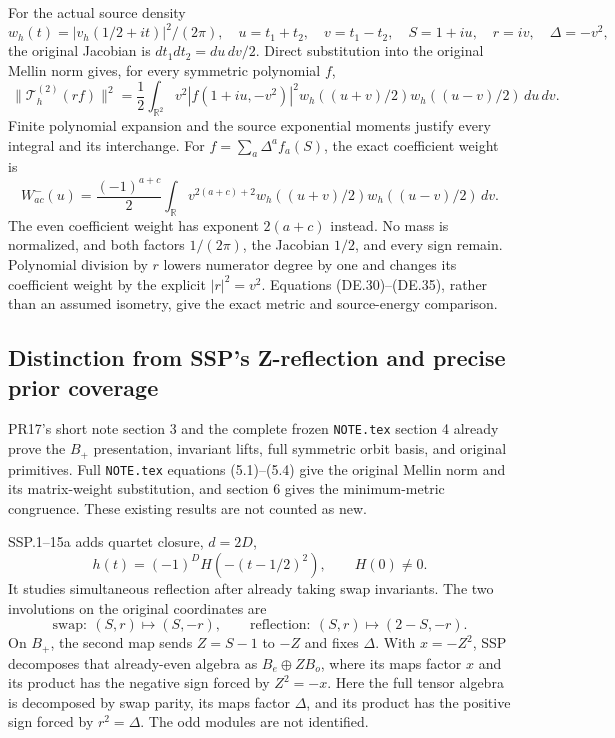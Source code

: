 For the actual source density
\[
 w_h(t)=|v_h(1/2+it)|^2/(2\pi),\quad
 u=t_1+t_2,\quad v=t_1-t_2,\quad
 S=1+iu,\quad r=iv,\quad\Delta=-v^2,
\]
the original Jacobian is \(dt_1dt_2=du\,dv/2\). Direct substitution into the original Mellin norm gives, for every symmetric polynomial \(f\),
\[
 \boxed{\ \|\mathcal T_h^{(2)}(rf)\|^2
 =\frac12\int_{\mathbb R^2}v^2|f(1+iu,-v^2)|^2
 w_h((u+v)/2)w_h((u-v)/2)\,du\,dv.\ }
 \tag{DE.34}
\]
Finite polynomial expansion and the source exponential moments justify every integral and its interchange. For \(f=\sum_a\Delta^af_a(S)\), the exact coefficient weight is
\[
 W^-_{ac}(u)=\frac{(-1)^{a+c}}2
 \int_{\mathbb R}v^{2(a+c)+2}
 w_h((u+v)/2)w_h((u-v)/2)\,dv.
 \tag{DE.35}
\]
The even coefficient weight has exponent \(2(a+c)\) instead. No mass is normalized, and both factors \(1/(2\pi)\), the Jacobian \(1/2\), and every sign remain. Polynomial division by \(r\) lowers numerator degree by one and changes its coefficient weight by the explicit \(|r|^2=v^2\). Equations (DE.30)--(DE.35), rather than an assumed isometry, give the exact metric and source-energy comparison.

\subsection{Distinction from SSP's Z-reflection and precise prior coverage}

PR17's short note section 3 and the complete frozen \texttt{NOTE.tex} section 4 already prove the \(B_+\) presentation, invariant lifts, full symmetric orbit basis, and original primitives. Full \texttt{NOTE.tex} equations (5.1)--(5.4) give the original Mellin norm and its matrix-weight substitution, and section 6 gives the minimum-metric congruence. These existing results are not counted as new.

SSP.1--15a adds quartet closure, \(d=2D\),
\[
 h(t)=(-1)^D H(-(t-1/2)^2),\qquad H(0)\ne0.
\]
It studies simultaneous reflection after already taking swap invariants. The two involutions on the original coordinates are
\[
 \mathrm{swap}:\ (S,r)\mapsto(S,-r),\qquad
 \mathrm{reflection}:\ (S,r)\mapsto(2-S,-r).
 \tag{DE.36}
\]
On \(B_+\), the second map sends \(Z=S-1\) to \(-Z\) and fixes \(\Delta\). With \(x=-Z^2\), SSP decomposes that already-even algebra as \(B_e\oplus ZB_o\), where its maps factor \(x\) and its product has the negative sign forced by \(Z^2=-x\). Here the full tensor algebra is decomposed by swap parity, its maps factor \(\Delta\), and its product has the positive sign forced by \(r^2=\Delta\). The odd modules are not identified.

